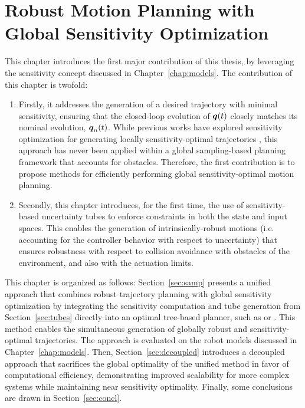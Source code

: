 \chapter{Robust Motion Planning with Global Sensitivity Optimization}\label{chap:samp}


This chapter introduces the first major contribution of this thesis, by leveraging the sensitivity concept discussed in Chapter~\ref{chap:models}.
The contribution of this chapter is twofold:
\begin{enumerate}
    \item Firstly, it addresses the generation of a desired trajectory with minimal sensitivity, ensuring that the closed-loop evolution of $\boldsymbol{q}(t)$ closely matches its nominal evolution, $\boldsymbol{q}_n(t)$. 
    While previous works have explored sensitivity optimization for generating locally sensitivity-optimal trajectories \cite{cPi,cTh}, this approach has never been applied within a global sampling-based planning framework that accounts for obstacles. 
    Therefore, the first contribution is to propose methods for efficiently performing global sensitivity-optimal motion planning.
    \item Secondly, this chapter introduces, for the first time, the use of sensitivity-based uncertainty tubes to enforce constraints in both the state and input spaces. 
    This enables the generation of intrinsically-robust motions (i.e. accounting for the controller behavior with respect to uncertainty) that ensures robustness with respect to collision avoidance with obstacles of the environment, and also with the actuation limits.
\end{enumerate}
This chapter is organized as follows: Section~\ref{sec:samp} presents a unified approach that combines robust trajectory planning with global sensitivity optimization by integrating the sensitivity computation and tube generation from Section~\ref{sec:tubes} directly into an optimal tree-based planner, such as  or . 
This method enables the simultaneous generation of globally robust and sensitivity-optimal trajectories. 
The approach is evaluated on the robot models discussed in Chapter~\ref{chap:models}.
Then, Section~\ref{sec:decoupled} introduces a decoupled approach that sacrifices the global optimality of the unified method in favor of computational efficiency, demonstrating improved scalability for more complex systems while maintaining near sensitivity optimality.
Finally, some conclusions are drawn in Section~\ref{sec:concl}.

